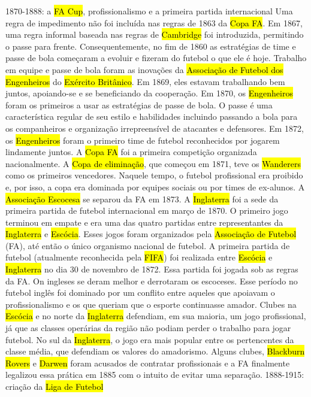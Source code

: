 \documentclass[a4paper,12pt]{article}
\begin{document}
1870-1888: a \hl{FA Cup}, profissionalismo e a primeira partida internacional
Uma regra de impedimento não foi incluída nas regras de 1863 da \hl{Copa FA}. Em 1867, uma regra informal baseada nas regras de \hl{Cambridge} foi introduzida, permitindo o passe para frente. Consequentemente, no fim de 1860 as estratégias de time e passe de bola começaram a evoluir e fizeram do futebol o que ele é hoje.
Trabalho em equipe e passe de bola foram as inovações da \hl{Associação de Futebol dos Engenheiros} do \hl{Exército Britânico}. Em 1869, eles estavam trabalhando bem juntos, apoiando-se e se beneficiando da cooperação. Em 1870, os \hl{Engenheiros} foram os primeiros a usar as estratégias de passe de bola. O passe é uma característica regular de seu estilo e habilidades incluindo passando a bola para os companheiros e organização irrepreensível de atacantes e defensores. Em 1872, os \hl{Engenheiros} foram o primeiro time de futebol reconhecidos por jogarem lindamente juntos.
A \hl{Copa FA} foi a primeira competição organizada nacionalmente. A \hl{Copa de eliminação}, que começou em 1871, teve os \hl{Wanderers} como os primeiros vencedores. Naquele tempo, o futebol profissional era proibido e, por isso, a copa era dominada por equipes sociais ou por times de ex-alunos. A \hl{Associação Escocesa} se separou da FA em 1873.
A \hl{Inglaterra} foi a sede da primeira partida de futebol internacional em março de 1870. O primeiro jogo terminou em empate e era uma das quatro partidas entre representantes da \hl{Inglaterra} e \hl{Escócia}. Esses jogos foram organizados pela \hl{Associação de Futebol} (FA), até então o único organismo nacional de futebol.
A primeira partida de futebol (atualmente reconhecida pela \hl{FIFA}) foi realizada entre \hl{Escócia} e \hl{Inglaterra} no dia 30 de novembro de 1872. Essa partida foi jogada sob as regras da FA. On ingleses se deram melhor e derrotaram os escoceses.
Esse período no futebol inglês foi dominado por um conflito entre aqueles que apoiavam o profissionalismo e os que queriam que o esporte continuasse amador. Clubes na \hl{Escócia} e no norte da \hl{Inglaterra} defendiam, em sua maioria, um jogo profissional, já que as classes operárias da região não podiam perder o trabalho para jogar futebol. No sul da \hl{Inglaterra}, o jogo era mais popular entre os pertencentes da classe média, que defendiam os valores do amadorismo. Alguns clubes, \hl{Blackburn Rovers} e \hl{Darwen} foram acusados de contratar profissionais e a FA finalmente legalizou essa prática em 1885 com o intuito de evitar uma separação.
1888-1915: criação da \hl{Liga de Futebol}
\end{document}

